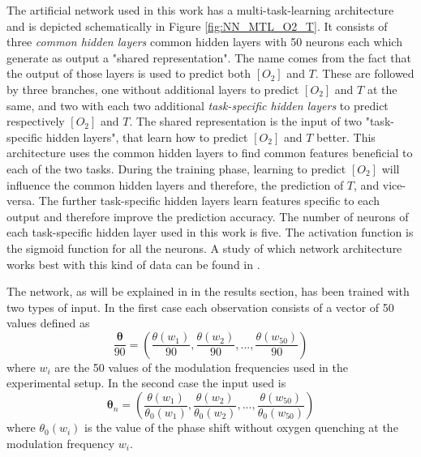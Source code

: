 \documentclass[9pt,twocolumn,twoside,pdftex]{optica}
\begin{document}
The artificial network used in this work has a multi-task-learning architecture and is depicted schematically in Figure \ref{fig:NN_MTL_O2_T}. It consists of three {\sl common hidden layers} common hidden layers with 50 neurons each which generate as output a "shared representation". The name comes from the fact that the output of those layers is used to predict both $[O_2]$ and $T$. These are followed by three branches, one without additional layers to predict $[O_2]$ and $T$ at the same, and two with each two additional {\sl task-specific hidden layers} to predict respectively $[O_2]$ and $T$. The shared representation is the input of two "task-specific hidden layers", that learn how to predict $[O_2]$ and $T$ better. This architecture uses the common hidden layers to find common features beneficial to each of the two tasks. During the training phase, learning to predict $[O_2]$ will influence the common hidden layers and therefore, the prediction of $T$, and vice-versa. The further task-specific hidden layers learn features specific to each output and therefore improve the prediction accuracy. The number of neurons of each task-specific hidden layer used in this work is five. The activation function is the sigmoid function for all the neurons.  A study of which network architecture works best with this kind of data can be found in \cite{Michelucci2019_2}.

The network, as will be explained in in the results section, has been trained with two types of input. In the first case each observation consists of a vector of 50 values defined as
\begin{equation}
\label{input1}
\frac{{\pmb \theta}}{90} = \left(
\frac{\theta(w_1)}{90} , \frac{\theta(w_2)}{90} , ..., \frac{\theta(w_{50})}{90} 
\right)
\end{equation}
where $w_i$ are the 50 values of the modulation frequencies used in the experimental setup.
In the second case the input used is
\begin{equation}
\label{input2}
{\pmb \theta}_n = \left(
\frac{\theta(w_1)}{\theta_0(w_1)} , \frac{\theta(w_2)}{\theta_0(w_2)} , ..., \frac{\theta(w_{50})}{\theta_0(w_{50})} 
\right)
\end{equation}
where $\theta_0(w_i)$ is the value of the phase shift without oxygen quenching at the modulation frequency $w_i$.
\end{document}
